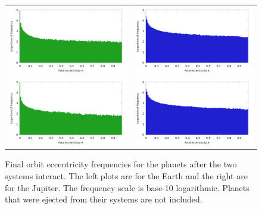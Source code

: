 \documentclass[12pt]{article}
\begin{document}
    \begin{figure}[H]
        \centering
        \caption{Final orbit eccentricity frequencies for the planets 
            after the two systems interact. The left plots are for the Earth and the right
            are for the Jupiter. The frequency scale is base-10 logarithmic.
            Planets that were ejected from their systems are not included.
        }
        \label{fig:eccentricies}

        \begin{tabular}{cc}
            \includegraphics[width=3.25in]{eccentricity_earth_1000} &
            \includegraphics[width=3.25in]{eccentricity_jupiter_1000} \\

            \includegraphics[width=3.25in]{eccentricity_earth_2000} &
            \includegraphics[width=3.25in]{eccentricity_jupiter_2000} \\


\end{tabular}
\end{figure}
\end{document}
